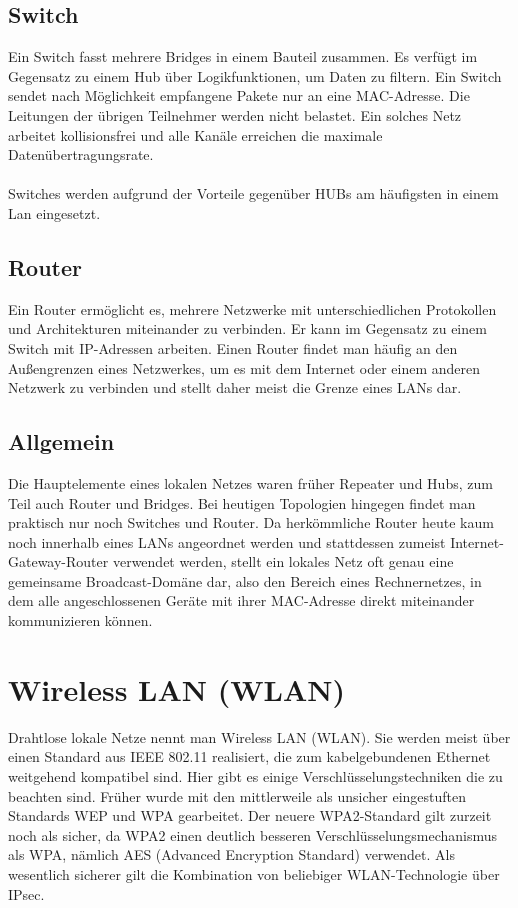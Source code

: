 \documentclass[a4paper,14pt]{scrreprt}
\begin{document}
\subsection{Switch}
Ein Switch fasst mehrere Bridges in einem Bauteil zusammen. Es verfügt im Gegensatz zu einem Hub über Logikfunktionen, um Daten zu filtern. Ein Switch sendet nach Möglichkeit empfangene Pakete nur an eine MAC-Adresse. Die Leitungen der übrigen Teilnehmer werden nicht belastet. Ein solches Netz arbeitet kollisionsfrei und alle Kanäle erreichen die maximale Datenübertragungsrate. \\\\Switches werden aufgrund der Vorteile gegenüber HUBs am häufigsten in einem Lan eingesetzt.
\subsection{Router}
Ein Router ermöglicht es, mehrere Netzwerke mit unterschiedlichen Protokollen und Architekturen miteinander zu verbinden. Er kann im Gegensatz zu einem Switch mit IP-Adressen arbeiten. Einen Router findet man häufig an den Außengrenzen eines Netzwerkes, um es mit dem Internet oder einem anderen Netzwerk zu verbinden und stellt daher meist die Grenze eines LANs dar.
\subsection{Allgemein}
Die Hauptelemente eines lokalen Netzes waren früher Repeater und Hubs, zum Teil auch Router und Bridges. Bei heutigen Topologien hingegen findet man praktisch nur noch Switches und Router. Da herkömmliche Router heute kaum noch innerhalb eines LANs angeordnet werden und stattdessen zumeist Internet-Gateway-Router verwendet werden, stellt ein lokales Netz oft genau eine gemeinsame Broadcast-Domäne dar, also den Bereich eines Rechnernetzes, in dem alle angeschlossenen Geräte mit ihrer MAC-Adresse direkt miteinander kommunizieren können.
\section{Wireless LAN (WLAN)}
Drahtlose lokale Netze nennt man Wireless LAN (WLAN). Sie werden meist über einen Standard aus IEEE 802.11 realisiert, die zum kabelgebundenen Ethernet weitgehend kompatibel sind. Hier gibt es einige Verschlüsselungstechniken die zu beachten sind. Früher wurde mit den mittlerweile als unsicher eingestuften Standards WEP und WPA gearbeitet. Der neuere WPA2-Standard gilt zurzeit noch als sicher, da WPA2 einen deutlich besseren Verschlüsselungsmechanismus als WPA, nämlich AES (Advanced Encryption Standard) verwendet. Als wesentlich sicherer gilt die Kombination von beliebiger WLAN-Technologie über IPsec.
\end{document}
